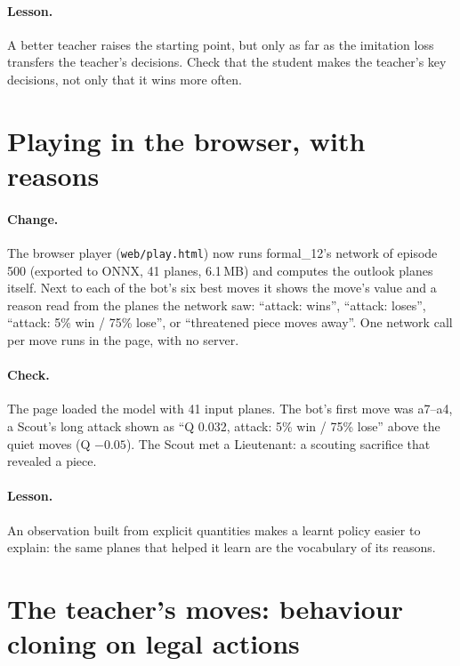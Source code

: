 \paragraph{Lesson.} A better teacher raises the starting point, but only as far as the imitation
loss transfers the teacher's decisions. Check that the student makes the teacher's key decisions,
not only that it wins more often.

\section{Playing in the browser, with reasons}
\label{sec:browser}

\paragraph{Change.} The browser player (\texttt{web/play.html}) now runs formal\_12's network of
episode 500 (exported to ONNX, 41 planes, 6.1\,MB) and computes the outlook planes itself. Next to
each of the bot's six best moves it shows the move's value and a reason read from the planes the
network saw: ``attack: wins'', ``attack: loses'', ``attack: 5\% win / 75\% lose'', or ``threatened
piece moves away''. One network call per move runs in the page, with no server.

\paragraph{Check.} The page loaded the model with 41 input planes. The bot's first move was a7--a4,
a Scout's long attack shown as ``Q 0.032, attack: 5\% win / 75\% lose'' above the quiet moves (Q
$-0.05$). The Scout met a Lieutenant: a scouting sacrifice that revealed a piece.

\paragraph{Lesson.} An observation built from explicit quantities makes a learnt policy easier to
explain: the same planes that helped it learn are the vocabulary of its reasons.

\section{The teacher's moves: behaviour cloning on legal actions}
\label{sec:behaviour_cloning}

